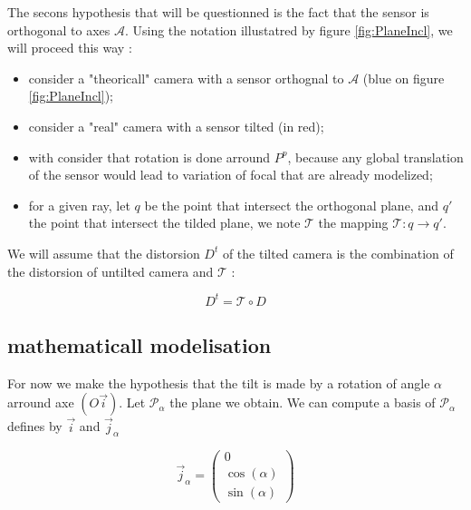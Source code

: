 The secons hypothesis  that will be questionned is the fact that the sensor is 
orthogonal to axes $\mathcal{A}$.  Using the notation illustatred by 
figure \ref{fig:PlaneIncl}, we will proceed this way :

\begin{itemize}
    \item consider a "theoricall" camera with a sensor orthognal to $\mathcal{A}$ (blue on figure \ref{fig:PlaneIncl});

    \item consider a "real" camera with a sensor tilted (in red);

    \item with consider that rotation is done arround $P^p$, because any global translation of the sensor
         would lead to variation of focal that are already modelized;

    \item  for a given ray, let $q$  be the point that intersect the  orthogonal plane,
	    and $q'$ the point that intersect the tilded  plane, we note
           $\mathcal{T}$  the mapping $\mathcal{T} : q \rightarrow q'$.

\end{itemize}

We will assume that the distorsion $D^t$ of the tilted camera is the combination
of the distorsion of untilted camera and $\mathcal{T}$ :

\begin{equation}
	D^t = \mathcal{T} \circ D 
\end{equation}


\subsection{mathematicall modelisation}

For now we make the hypothesis that the tilt is made by a rotation of angle $\alpha$ arround axe $(O\vec{i})$.
Let $\mathcal{P}_\alpha$ the plane we obtain.  We can compute a basis  of $\mathcal{P}_\alpha$ defines
by  $\vec{i} $ and  $\vec{j}_\alpha $


\begin{equation}
	\vec{j}_\alpha = \begin{pmatrix} 0 \\ \cos(\alpha) \\ \sin(\alpha)  \end{pmatrix}
\end{equation}

